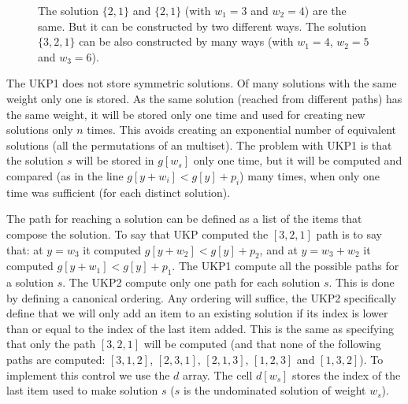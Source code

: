 \documentclass[12pt]{article}
\newcommand{\drawhvector}[6]{
	\edef \origin {#1}
	\edef \xmax {#2}
	\edef \rs {(#3,#4)}
	\edef \scale {#5}
	\foreach \x in {0,...,\xmax}{
		\draw [shift={\origin}] (\x,0) rectangle +\rs;
		\node [scale=\scale, shift={\origin}, font=\LARGE] at (\x + 0.5, 0.5) {\(\x\)};
	}
}
\begin{document}
\begin{figure}[H]
\caption{The solution \(\{2,1\}\) and \(\{2,1\}\) (with \(w_1 = 3\) and \(w_2 = 4\)) are the same. But it can be constructed by two different ways. The solution \(\{3,2,1\}\) can be also constructed by many ways (with \(w_1 = 4\), \(w_2 = 5\) and \(w_3 = 6\)). }
\label{fig:symmetry}
\end{figure}

The UKP1 does not store symmetric solutions. Of many solutions with the same weight only one is stored. As the same solution (reached from different paths) has the same weight, it will be stored only one time and used for creating new solutions only \(n\) times. This avoids creating an exponential number of equivalent solutions (all the permutations of an multiset). The problem with UKP1 is that the solution \(s\) will be stored in \(g[w_s]\) only one time, but it will be computed and compared (as in the line \(g[y + w_i] < g[y] + p_i\)) many times, when only one time was sufficient (for each distinct solution). 

The path for reaching a solution can be defined as a list of the items that compose the solution. To say that UKP computed the \([3,2,1]\) path is to say that: at \(y = w_3\) it computed \(g[y + w_2] < g[y] + p_2\), and at \(y = w_3 + w_2\) it computed \(g[y + w_1] < g[y] + p_1\). The UKP1 compute all the possible paths for a solution \(s\). The UKP2 compute only one path for each solution \(s\). This is done by defining a canonical ordering. Any ordering will suffice, the UKP2 specifically define that we will only add an item to an existing solution if its index is lower than or equal to the index of the last item added. This is the same as specifying that only the path \([3,2,1]\) will be computed (and that none of the following paths are computed: \([3,1,2]\), \([2,3,1]\), \([2,1,3]\), \([1,2,3]\) and \([1,3,2]\)). To implement this control we use the \(d\) array. The cell \(d[w_s]\) stores the index of the last item used to make solution \(s\) (\(s\) is the undominated solution of weight \(w_s\)). 
\end{document}
